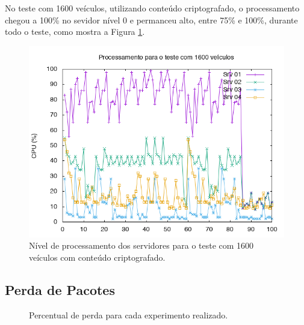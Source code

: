 \documentclass[
	12pt,				%
	oneside,			%
	a4paper,			%
	english,			%
	brazil				%
	]{abntex2ppgsi}
\begin{document}
No teste com 1600 veículos, utilizando conteúdo criptografado, o processamento chegou a 100\% no sevidor nível 0 e permanceu alto, entre 75\% e 100\%, durante todo o teste, como mostra a Figura \ref{fig:processamento1600}.

\begin{figure}[h!]
	\centering
	\includegraphics[width=0.7\columnwidth]{images/processamento2.png}
	\caption{Nível de processamento dos servidores para o teste com 1600 veículos com conteúdo criptografado.}
	\label{fig:processamento1600}
\end{figure}

\subsection{Perda de Pacotes}

\begin{figure}[ht!]
	\caption{Percentual de perda para cada experimento realizado.}
	\centering
	\label{fig:graficoperda}
\end{figure}  
\end{document}

